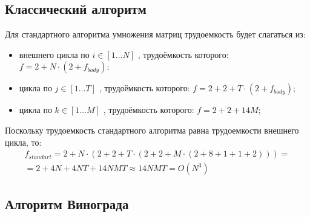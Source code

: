 \subsection{Классический алгоритм}

Для стандартного алгоритма умножения матриц трудоемкость будет слагаться из:

\begin{itemize}[label=---]
	\item внешнего цикла по $i \in [1 \ldots N]$ , трудоёмкость которого: $f = 2 + N \cdot (2 + f_{body})$;
	\item цикла по $j \in [1 \ldots T]$ , трудоёмкость которого: $f = 2 + 2 + T \cdot (2 + f_{body})$;
	\item цикла по $k \in [1 \ldots M]$ , трудоёмкость которого: $f = 2 + 2 + 14M$;
\end{itemize}

Поскольку трудоемкость стандартного алгоритма равна трудоемкости внешнего цикла, то:
\begin{equation}
	\label{сomplexity:standart}
	\begin{gathered}
		f_{standart} = 2 + N \cdot (2 + 2 + T \cdot (2 + 2 + M \cdot (2 + 8 + 1 + 1 + 2)))= \\
		= 2 + 4N + 4NT + 14NMT \approx 14NMT = O(N^3)
	\end{gathered}
\end{equation}

\clearpage

\subsection{Алгоритм Винограда}

